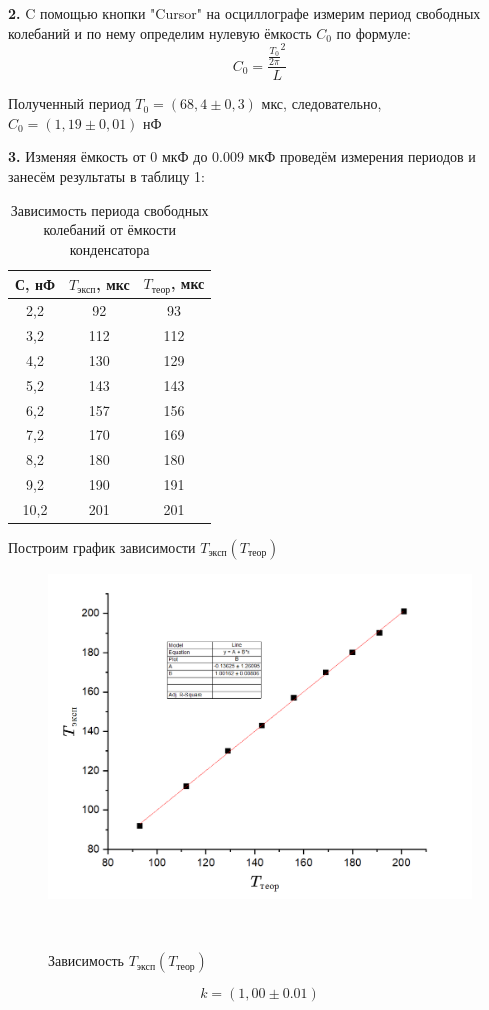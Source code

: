 \documentclass[a4paper, 12pt]{article}
\newcommand{\te}[2]{{#1}_{\text{#2}}}
\begin{document}
\textbf{2.} C помощью кнопки "Cursor" на осциллографе измерим период свободных колебаний и по нему определим нулевую ёмкость $C_0$ по формуле:
\[
	C_0 = \frac{{\frac{T_0}{2\pi}}^2}{L}
\]

Полученный период $T_0 = (68,4 \pm 0,3)$ мкс, следовательно, $C_0 = (1,19 \pm 0,01)$ нФ

\textbf{3.} Изменяя ёмкость от 0 мкФ до 0.009 мкФ проведём измерения
периодов и занесём результаты в таблицу 1:
\begin{table}[h!]
\centering
\caption{Зависимость периода свободных колебаний от ёмкости конденсатора}
\vspace{0.3cm}
\label{tab:1}
\begin{tabular}{|c|c|c|}
\hline
С, нФ & $\te{T}{эксп}$, мкс & $\te{T}{теор}$, мкс \\ \hline
2,2   & 92                & 93                \\ \hline
3,2   & 112               & 112               \\ \hline
4,2   & 130               & 129               \\ \hline
5,2   & 143               & 143               \\ \hline
6,2   & 157               & 156               \\ \hline
7,2   & 170               & 169               \\ \hline
8,2   & 180               & 180               \\ \hline
9,2   & 190               & 191               \\ \hline
10,2  & 201               & 201               \\ \hline
\end{tabular}
\end{table}
Построим график зависимости $T_\text{эксп}(T_{\text{теор}})$
\begin{figure}[h!]
	\begin{center}
	\includegraphics[width=\textwidth]{image.png}
	\caption{Зависимость $T_{\text{эксп}}(T_{\text{теор}})$} \
	\end{center}
	\end{figure}
$$k = (1,00 \pm 0.01)$$
\end{document}
